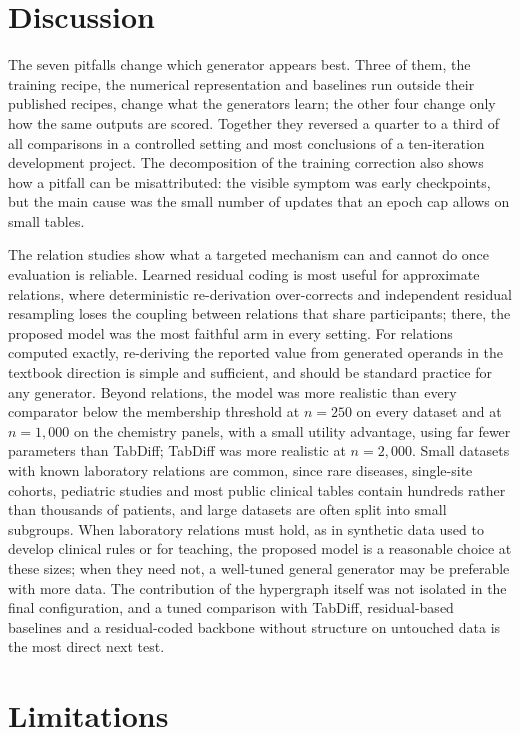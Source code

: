 \documentclass[conference]{IEEEtran}
\begin{document}
\section{Discussion}

The seven pitfalls change which generator appears best. Three of them, the training recipe, the numerical representation and baselines run outside their published recipes, change what the generators learn; the other four change only how the same outputs are scored. Together they reversed a quarter to a third of all comparisons in a controlled setting and most conclusions of a ten-iteration development project. The decomposition of the training correction also shows how a pitfall can be misattributed: the visible symptom was early checkpoints, but the main cause was the small number of updates that an epoch cap allows on small tables.

The relation studies show what a targeted mechanism can and cannot do once evaluation is reliable. Learned residual coding is most useful for approximate relations, where deterministic re-derivation over-corrects and independent residual resampling loses the coupling between relations that share participants; there, the proposed model was the most faithful arm in every setting. For relations computed exactly, re-deriving the reported value from generated operands in the textbook direction is simple and sufficient, and should be standard practice for any generator. Beyond relations, the model was more realistic than every comparator below the membership threshold at $n = 250$ on every dataset and at $n = 1{,}000$ on the chemistry panels, with a small utility advantage, using far fewer parameters than TabDiff; TabDiff was more realistic at $n = 2{,}000$. Small datasets with known laboratory relations are common, since rare diseases, single-site cohorts, pediatric studies and most public clinical tables contain hundreds rather than thousands of patients, and large datasets are often split into small subgroups. When laboratory relations must hold, as in synthetic data used to develop clinical rules or for teaching, the proposed model is a reasonable choice at these sizes; when they need not, a well-tuned general generator may be preferable with more data. The contribution of the hypergraph itself was not isolated in the final configuration, and a tuned comparison with TabDiff, residual-based baselines and a residual-coded backbone without structure on untouched data is the most direct next test.

\section{Limitations}
\end{document}
